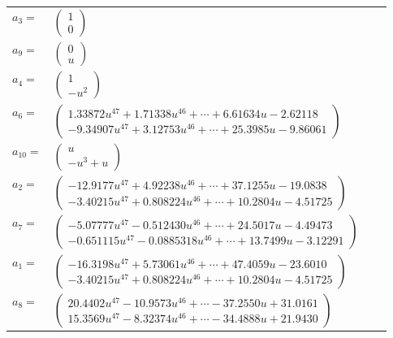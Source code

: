 \documentclass[1p]{elsarticle_modified}
\theoremstyle{definition}
\begin{document}
\begin{tabular}{m{7pt} m{180pt} m{7pt} m{180pt} }
\flushright $a_{3}=$&$\begin{pmatrix}1\\0\end{pmatrix}$ \\
\flushright $a_{9}=$&$\begin{pmatrix}0\\u\end{pmatrix}$ \\
\flushright $a_{4}=$&$\begin{pmatrix}1\\- u^2\end{pmatrix}$ \\
\flushright $a_{6}=$&$\begin{pmatrix}1.33872 u^{47}+1.71338 u^{46}+\cdots+6.61634 u-2.62118\\-9.34907 u^{47}+3.12753 u^{46}+\cdots+25.3985 u-9.86061\end{pmatrix}$ \\
\flushright $a_{10}=$&$\begin{pmatrix}u\\- u^3+u\end{pmatrix}$ \\
\flushright $a_{2}=$&$\begin{pmatrix}-12.9177 u^{47}+4.92238 u^{46}+\cdots+37.1255 u-19.0838\\-3.40215 u^{47}+0.808224 u^{46}+\cdots+10.2804 u-4.51725\end{pmatrix}$ \\
\flushright $a_{7}=$&$\begin{pmatrix}-5.07777 u^{47}-0.512430 u^{46}+\cdots+24.5017 u-4.49473\\-0.651115 u^{47}-0.0885318 u^{46}+\cdots+13.7499 u-3.12291\end{pmatrix}$ \\
\flushright $a_{1}=$&$\begin{pmatrix}-16.3198 u^{47}+5.73061 u^{46}+\cdots+47.4059 u-23.6010\\-3.40215 u^{47}+0.808224 u^{46}+\cdots+10.2804 u-4.51725\end{pmatrix}$ \\
\flushright $a_{8}=$&$\begin{pmatrix}20.4402 u^{47}-10.9573 u^{46}+\cdots-37.2550 u+31.0161\\15.3569 u^{47}-8.32374 u^{46}+\cdots-34.4888 u+21.9430\end{pmatrix}$ \\

\end{tabular}
\end{document}
